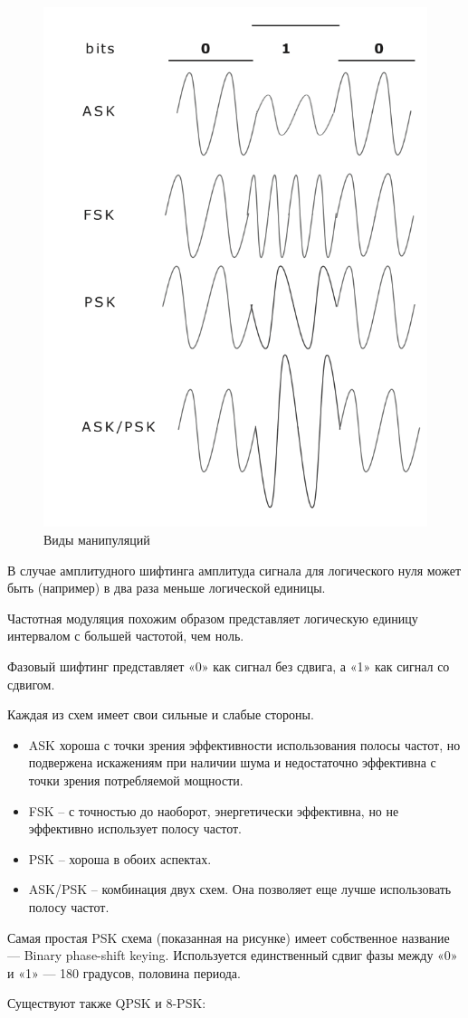	\begin{figure}[H]
		\begin{center}
			\includegraphics[width=0.4\linewidth]{../modulations}
			\caption{Виды манипуляций}
		\end{center}
	\end{figure}
	
	В случае амплитудного шифтинга амплитуда сигнала для логического нуля может быть (например) в два раза меньше логической единицы.
	
	Частотная модуляция похожим образом представляет логическую единицу интервалом с большей частотой, чем ноль.
	
	Фазовый шифтинг представляет «0» как сигнал без сдвига, а «1» как сигнал со сдвигом.
	
	Каждая из схем имеет свои сильные и слабые стороны.
	\begin{itemize}
		\item ASK хороша с точки зрения эффективности использования полосы частот, но подвержена искажениям при наличии шума и недостаточно эффективна с точки зрения потребляемой мощности.
		\item FSK – с точностью до наоборот, энергетически эффективна, но не эффективно использует полосу частот.
		\item PSK – хороша в обоих аспектах.
		\item ASK/PSK – комбинация двух схем. Она позволяет еще лучше использовать полосу частот.
	\end{itemize}
	
	Самая простая PSK схема (показанная на рисунке) имеет собственное название — Binary phase-shift keying. Используется единственный сдвиг фазы между «0» и «1» — 180 градусов, половина периода.
	
	Существуют также QPSK и 8-PSK:
	
